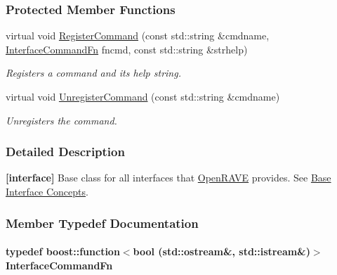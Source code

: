 \subsubsection*{Protected Member Functions}
\begin{DoxyCompactItemize}
\item 
virtual void \hyperlink{classOpenRAVE_1_1InterfaceBase_a840776899a1d3677582fc6ef87be6ef2}{RegisterCommand} (const std::string \&cmdname, \hyperlink{classOpenRAVE_1_1InterfaceBase_af078e9e99c82cbd71d0bfa325438514e}{InterfaceCommandFn} fncmd, const std::string \&strhelp)
\begin{DoxyCompactList}\small\item\em Registers a command and its help string. \item\end{DoxyCompactList}\item 
\hypertarget{classOpenRAVE_1_1InterfaceBase_a1a70446e03a29c6c9a5650886027cd2e}{
virtual void \hyperlink{classOpenRAVE_1_1InterfaceBase_a1a70446e03a29c6c9a5650886027cd2e}{UnregisterCommand} (const std::string \&cmdname)}
\label{classOpenRAVE_1_1InterfaceBase_a1a70446e03a29c6c9a5650886027cd2e}

\begin{DoxyCompactList}\small\item\em Unregisters the command. \item\end{DoxyCompactList}\end{DoxyCompactItemize}


\subsubsection{Detailed Description}
{\bfseries \mbox{[}interface\mbox{]}} Base class for all interfaces that \hyperlink{namespaceOpenRAVE}{OpenRAVE} provides. See \hyperlink{interface__concepts}{Base Interface Concepts}. 

\subsubsection{Member Typedef Documentation}
\hypertarget{classOpenRAVE_1_1InterfaceBase_af078e9e99c82cbd71d0bfa325438514e}{
\paragraph[{InterfaceCommandFn}]{\setlength{\rightskip}{0pt plus 5cm}typedef boost::function$<$bool (std::ostream\&, std::istream\&)$>$ {\bf InterfaceCommandFn}}\hfill}
\label{classOpenRAVE_1_1InterfaceBase_af078e9e99c82cbd71d0bfa325438514e}


